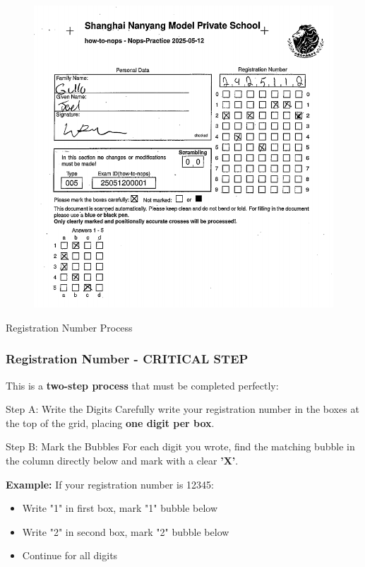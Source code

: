 \documentclass{beamer}
\begin{document}
\begin{frame}

\begin{figure}
    \centering
    \includegraphics[width=0.5\linewidth]{phys11-exam-prep-nops-answer-sheet.png}
\end{figure}
\end{frame}

\begin{frame}{Registration Number Process}
\frametitle{Registration Number - CRITICAL STEP}
This is a \textbf{two-step process} that must be completed perfectly:

\begin{block}{Step A: Write the Digits}
Carefully write your registration number in the boxes at the top of the grid, placing \textbf{one digit per box}.
\end{block}

\begin{block}{Step B: Mark the Bubbles}
For each digit you wrote, find the matching bubble in the column directly below and mark with a clear \textbf{'X'}.
\end{block}

\textbf{Example:} If your registration number is 12345:
\begin{itemize}
\item Write "1" in first box, mark "1" bubble below
\item Write "2" in second box, mark "2" bubble below
\item Continue for all digits
\end{itemize}
\end{frame}
\end{document}
